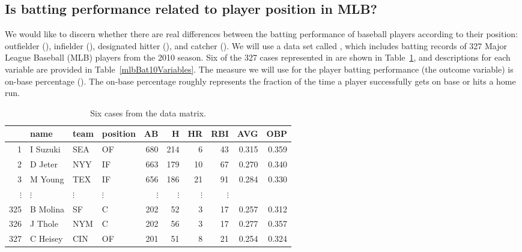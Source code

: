 \subsection{Is batting performance related to player position in MLB?}

We would like to discern whether there are real differences between the batting performance of baseball players according to their position: outfielder (), infielder (), designated hitter (), and catcher (). We will use a data set called , which includes batting records of 327 Major League Baseball (MLB) players from the 2010 season. Six of the 327 cases represented in  are shown in Table~\ref{mlbBat10DataMatrix}, and descriptions for each variable are provided in Table~\ref{mlbBat10Variables}. The measure we will use for the player batting performance (the outcome variable) is on-base percentage (). The on-base percentage roughly represents the fraction of the time a player successfully gets on base or hits a home run.

\begin{table}[h]
\centering
\begin{tabular}{rlllrrrrrr}
  \hline
 & name & team & position & AB & H & HR &RBI & AVG & OBP \\ 
  \hline
1 & I Suzuki & SEA & OF & 680 & 214 & 6 & 43 & 0.315 & 0.359 \\ 
  2 & D Jeter & NYY & IF & 663 & 179 & 10 & 67 & 0.270 & 0.340 \\ 
  3 & M Young & TEX & IF & 656 & 186 & 21 & 91 & 0.284 & 0.330 \\ 
  $\vdots$ & $\vdots$ & $\vdots$ & $\vdots$ & $\vdots$ & $\vdots$ & $\vdots$ & $\vdots$ \\
  325 & B Molina & SF & C & 202 & 52 & 3 & 17 & 0.257 & 0.312 \\ 
  326 & J Thole & NYM & C & 202 & 56 & 3 & 17 & 0.277 & 0.357 \\ 
  327 & C Heisey & CIN & OF & 201 & 51 & 8 & 21 & 0.254 & 0.324 \\ 
   \hline
\end{tabular}
\caption{Six cases from the  data matrix.}
\label{mlbBat10DataMatrix}
\end{table}

